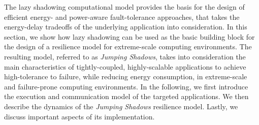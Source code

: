 




%



The lazy shadowing computational model provides the basis for the design of efficient energy- and power-aware fault-tolerance approaches, that takes the energy-delay tradeoffs of the underlying application into consideration. In this section, we show how lazy shadowing can be used as the basic building block for the design of a resilience model for extreme-scale computing environments. The resulting model, referred to as {\it Jumping Shadows}, takes into consideration the main characteristics of tightly-coupled, highly-scalable applications to achieve high-tolerance to failure, while reducing energy consumption, in extreme-scale and failure-prone computing environments. In the following, we first introduce the execution and communication model of the targeted applications. We then describe the dynamics of the {\it Jumping Shadows} resilience model. Lastly, we discuss important aspects of its implementation. 

